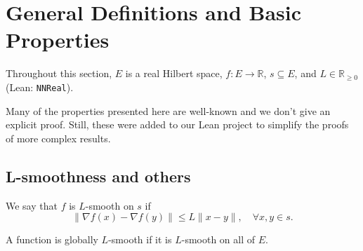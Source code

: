 %
%


\chapter{General Definitions and Basic Properties}\label{sec:GeneralDefinitions}

Throughout this section, $E$ is a real Hilbert space, $f : E \to \mathbb{R}$,
$s \subseteq E$, and $L \in \mathbb{R}_{\ge 0}$ (Lean: \texttt{NNReal}).

Many of the properties presented here are well-known and we don't give an explicit proof.
Still, these were added to our Lean project to simplify the proofs of more complex results.
\section{L-smoothness and others}
\begin{definition}\label{def:l_smooth_on}
  \leanok{}
  \uses{}
  We say that $f$ is $L$-smooth on $s$ if
  \[
    \|\nabla f(x) - \nabla f(y)\| \le L\|x-y\|,\quad \forall x,y\in s.
  \]
\end{definition}

\begin{definition}\label{def:l_smooth_fn}
  \leanok{}
  \uses{}
  A function is globally $L$-smooth if it is $L$-smooth on all of $E$.%
\end{definition}

